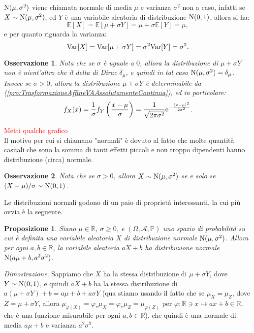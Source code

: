 \documentclass[11pt]{book}
\makeatletter
\theoremstyle{Definizione}
\theoremstyle{TeoremaProposizioneLemmaCorollario}
\newtheorem{mypropo}[myteo]{Proposizione}
\theoremstyle{OsservazioneNota}
\newtheorem{myobs}{Osservazione}[section]
\renewenvironment{proof}[1][\proofname]{\par
  \normalfont \topsep6\p@\@plus6\p@\relax
  \trivlist
  \item[\hskip\labelsep
        \itshape
    #1\@addpunct{.}]\ignorespaces
}{%
  \endtrivlist\@endpefalse
}
\newcommand{\R}{\mathbb{R}}
\renewcommand{\P}{\mathbb{P}}
\newcommand{\e}{\textup{e}}
\newcommand{\E}{\mathbb{E}}
\newcommand{\Var}{\textup{Var}}
\renewenvironment{proof}{\textsl{Dimostrazione}.}{}
\makeatother
\begin{document}
\noindent
$\textup{N}(\mu,\sigma^2)$ viene chiamata normale di media $\mu$ e varianza $\sigma^2$ non a caso, infatti se $X \sim \textup{N}(\mu,\sigma^2)$, ed $Y$ è una variabile aleatoria di distribuzione $\textup{N}(0,1)$, allora si ha:
$$
\E[X] = \E[\mu+\sigma Y] = \mu +\sigma \E[Y] = \mu,
$$
e per quanto riguarda la varianza:
$$
\Var[X] = \Var[\mu + \sigma Y] = \sigma^2 \Var[Y] = \sigma^2.
$$
\begin{myobs}
Nota che se $\sigma$ è uguale a $0$, allora la distribuzione di $\mu+\sigma Y$ non è nient'altro che il delta di Dirac $\delta_\mu$, e quindi in tal caso $\textup{N}(\mu,\sigma^2) = \delta_\mu$. Invece se $\sigma > 0$, allora la distribuzione $\mu+\sigma Y$ è determinabile da (\ref{pro:TrasformazioneAffineVAAssolutamenteContinua}), ed in particolare:
$$
f_X(x) = \frac{1}{\sigma}f_Y\left(\frac{x-\mu}{\sigma}\right) = \frac{1}{\sqrt{2\pi\sigma^2}}\e^{-\frac{(x-\mu)^2}{2\sigma^2}}.
$$
\end{myobs}
\textcolor{red}{Metti qualche grafico}\\
Il motivo per cui si chiamano "normali" è dovuto al fatto che molte quantità casuali che sono la somma di tanti effetti piccoli e non troppo dipendenti hanno distribuzione (circa) normale.
\begin{myobs}
Nota che se $\sigma > 0$, allora $X \sim \textup{N}(\mu,\sigma^2)$ se e solo se $(X-\mu)/\sigma \sim \textup{N}(0,1)$.
\end{myobs}
Le distribuzioni normali godono di un paio di proprietà interessanti, la cui più ovvia è la seguente.
\begin{boxpro}
\begin{mypropo}\label{pro:NormaliInvariantiTrasformazioniAffini}
Siano $\mu\in \R$, $\sigma \geq 0$, e $(\Omega,\mathcal{A},\P)$ uno spazio di probabilità su cui è definita una variabile aleatoria $X$ di distribuzione normale $\textup{N}(\mu,\sigma^2)$. Allora per ogni $a,b\in \R$, la variabile aleatoria $aX+b$ ha distribuzione normale $\textup{N}(a\mu+b,a^2\sigma^2)$.
\end{mypropo}
\tcblower
\begin{proof}
Sappiamo che $X$ ha la stessa distribuzione di $\mu  + \sigma Y$, dove $Y \sim \textup{N}(0,1)$, e quindi $aX+b$ ha la stessa distribuzione di $a(\mu+\sigma Y)+b = a\mu+b+a\sigma Y$ (qua stiamo usando il fatto che se $\mu_X = \mu_{Z}$, dove $Z = \mu+\sigma Y$, allora $\mu_{\varphi(X)} = \varphi_*\mu_X = \varphi_*\mu_{Z} = \mu_{\varphi(Z)}$ per $\varphi:\R \ni x \longmapsto ax+b\in \R$, che è una funzione misurabile per ogni $a,b\in \R$), che quindi è una normale di media $a\mu+b$ e varianza $a^2\sigma^2$.
\end{proof}
\end{boxpro}
\end{document}
